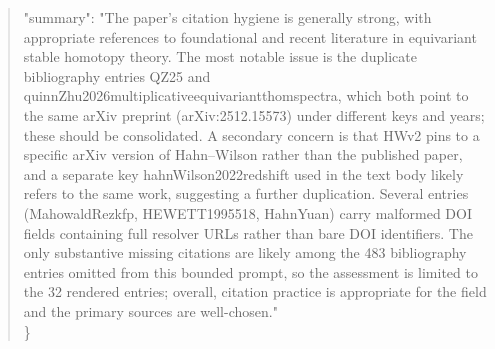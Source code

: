 \documentclass[11pt]{article}
\begin{document}
\begin{quote}
  "summary": "The paper's citation hygiene is generally strong, with appropriate references to foundational and recent literature in equivariant stable homotopy theory. The most notable issue is the duplicate bibliography entries QZ25 and quinnZhu2026multiplicativeequivariantthomspectra, which both point to the same arXiv preprint (arXiv:2512.15573) under different keys and years; these should be consolidated. A secondary concern is that HWv2 pins to a specific arXiv version of Hahn--Wilson rather than the published paper, and a separate key hahnWilson2022redshift used in the text body likely refers to the same work, suggesting a further duplication. Several entries (MahowaldRezkfp, HEWETT1995518, HahnYuan) carry malformed DOI fields containing full resolver URLs rather than bare DOI identifiers. The only substantive missing citations are likely among the 483 bibliography entries omitted from this bounded prompt, so the assessment is limited to the 32 rendered entries; overall, citation practice is appropriate for the field and the primary sources are well-chosen."\\
\}\\
\end{quote}
\end{document}
